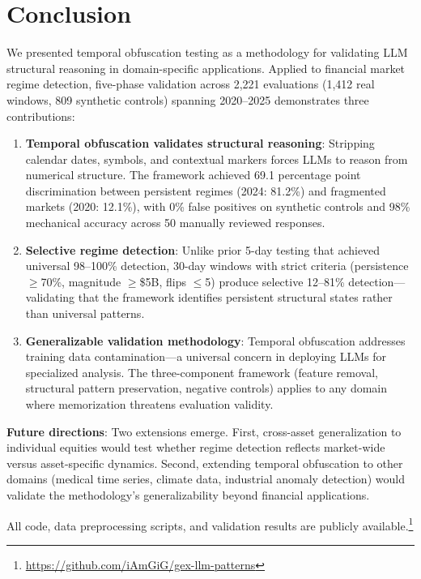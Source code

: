 \section{Conclusion}
\label{sec:conclusion}

We presented temporal obfuscation testing as a methodology for validating LLM structural reasoning in domain-specific applications. Applied to financial market regime detection, five-phase validation across 2,221 evaluations (1,412 real windows, 809 synthetic controls) spanning 2020--2025 demonstrates three contributions:

\begin{enumerate}
\item \textbf{Temporal obfuscation validates structural reasoning}: Stripping calendar dates, symbols, and contextual markers forces LLMs to reason from numerical structure. The framework achieved 69.1 percentage point discrimination between persistent regimes (2024: 81.2\%) and fragmented markets (2020: 12.1\%), with 0\% false positives on synthetic controls and 98\% mechanical accuracy across 50 manually reviewed responses.

\item \textbf{Selective regime detection}: Unlike prior 5-day testing that achieved universal 98--100\% detection, 30-day windows with strict criteria (persistence $\geq$70\%, magnitude $\geq$\$5B, flips $\leq$5) produce selective 12--81\% detection---validating that the framework identifies persistent structural states rather than universal patterns.

\item \textbf{Generalizable validation methodology}: Temporal obfuscation addresses training data contamination---a universal concern in deploying LLMs for specialized analysis. The three-component framework (feature removal, structural pattern preservation, negative controls) applies to any domain where memorization threatens evaluation validity.
\end{enumerate}

\noindent\textbf{Future directions}: Two extensions emerge. First, cross-asset generalization to individual equities would test whether regime detection reflects market-wide versus asset-specific dynamics. Second, extending temporal obfuscation to other domains (medical time series, climate data, industrial anomaly detection) would validate the methodology's generalizability beyond financial applications.

All code, data preprocessing scripts, and validation results are publicly available.\footnote{\url{https://github.com/iAmGiG/gex-llm-patterns}}
